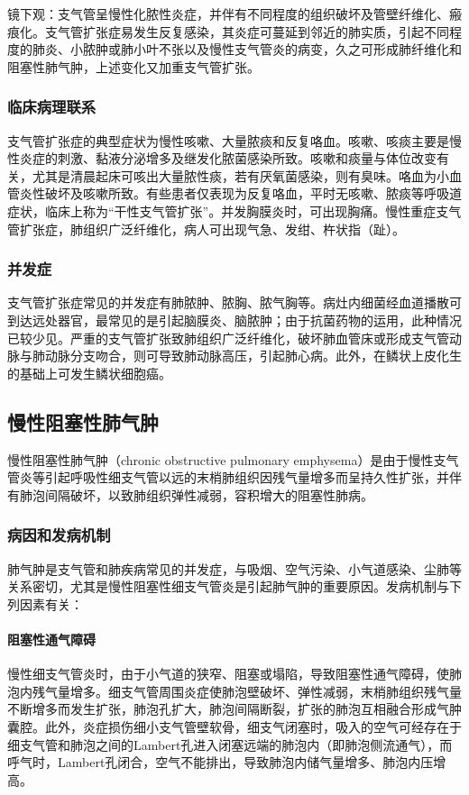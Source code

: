镜下观：支气管呈慢性化脓性炎症，并伴有不同程度的组织破坏及管壁纤维化、瘢痕化。支气管扩张症易发生反复感染，其炎症可蔓延到邻近的肺实质，引起不同程度的肺炎、小脓肿或肺小叶不张以及慢性支气管炎的病变，久之可形成肺纤维化和阻塞性肺气肿，上述变化又加重支气管扩张。

\subsubsection{临床病理联系}

支气管扩张症的典型症状为慢性咳嗽、大量脓痰和反复咯血。咳嗽、咳痰主要是慢性炎症的刺激、黏液分泌增多及继发化脓菌感染所致。咳嗽和痰量与体位改变有关，尤其是清晨起床可咳出大量脓性痰，若有厌氧菌感染，则有臭味。咯血为小血管炎性破坏及咳嗽所致。有些患者仅表现为反复咯血，平时无咳嗽、脓痰等呼吸道症状，临床上称为“干性支气管扩张”。并发胸膜炎时，可出现胸痛。慢性重症支气管扩张症，肺组织广泛纤维化，病人可出现气急、发绀、杵状指（趾）。

\subsubsection{并发症}

支气管扩张症常见的并发症有肺脓肿、脓胸、脓气胸等。病灶内细菌经血道播散可到达远处器官，最常见的是引起脑膜炎、脑脓肿；由于抗菌药物的运用，此种情况已较少见。严重的支气管扩张致肺组织广泛纤维化，破坏肺血管床或形成支气管动脉与肺动脉分支吻合，则可导致肺动脉高压，引起肺心病。此外，在鳞状上皮化生的基础上可发生鳞状细胞癌。

\subsection{慢性阻塞性肺气肿}

慢性阻塞性肺气肿（chronic obstructive pulmonary
emphysema）是由于慢性支气管炎等引起呼吸性细支气管以远的末梢肺组织因残气量增多而呈持久性扩张，并伴有肺泡间隔破坏，以致肺组织弹性减弱，容积增大的阻塞性肺病。

\subsubsection{病因和发病机制}

肺气肿是支气管和肺疾病常见的并发症，与吸烟、空气污染、小气道感染、尘肺等关系密切，尤其是慢性阻塞性细支气管炎是引起肺气肿的重要原因。发病机制与下列因素有关：

\paragraph{阻塞性通气障碍}
慢性细支气管炎时，由于小气道的狭窄、阻塞或塌陷，导致阻塞性通气障碍，使肺泡内残气量增多。细支气管周围炎症使肺泡壁破坏、弹性减弱，末梢肺组织残气量不断增多而发生扩张，肺泡孔扩大，肺泡间隔断裂，扩张的肺泡互相融合形成气肿囊腔。此外，炎症损伤细小支气管壁软骨，细支气闭塞时，吸入的空气可经存在于细支气管和肺泡之间的Lambert孔进入闭塞远端的肺泡内（即肺泡侧流通气），而呼气时，Lambert孔闭合，空气不能排出，导致肺泡内储气量增多、肺泡内压增高。

